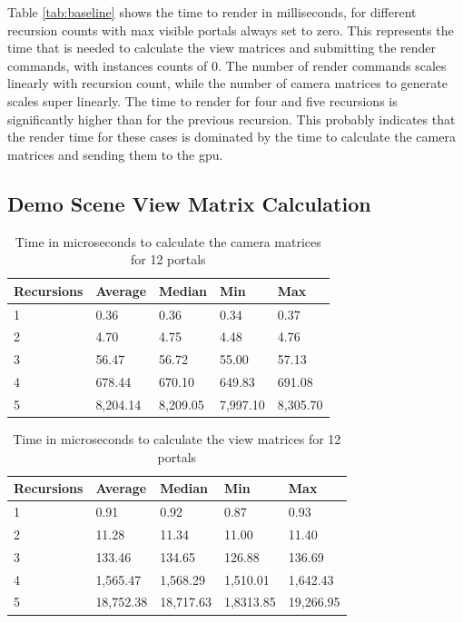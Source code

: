 Table \ref{tab:baseline} shows the time to render in milliseconds, for different recursion counts with max visible portals always set to zero. This represents the time that is needed to calculate the view matrices and submitting the render commands, with instances counts of 0. The number of render commands scales linearly with recursion count, while the number of camera matrices to generate scales super linearly. The time to render for four and five recursions is significantly higher than for the previous recursion. This probably indicates that the render time for these cases is dominated by the time to calculate the camera matrices and sending them to the \gls{gpu}.

\subsection{Demo Scene View Matrix Calculation}
\label{section:perfmatrixcalc}

\begin{table}[H]
	\centering
	\begin{tabular}{|l|l|l|l|l|}
		\hline
		Recursions & Average & Median  & Min     & Max     \\ \hline
		1          & 0.36    & 0.36    & 0.34    & 0.37    \\ \hline
		2          & 4.70    & 4.75    & 4.48    & 4.76    \\ \hline
		3          & 56.47   & 56.72   & 55.00   & 57.13   \\ \hline
		4          & 678.44  & 670.10  & 649.83  & 691.08  \\ \hline
		5          & 8,204.14 & 8,209.05 & 7,997.10 & 8,305.70\\ \hline
	\end{tabular}
	\caption{Time in microseconds to calculate the camera matrices for 12 portals}
	\label{tab:cameramatricecalc}
\end{table}

\begin{table}[H]
	\centering
	\begin{tabular}{|l|l|l|l|l|}
		\hline
		Recursions & Average   & Median  	& Min     	& Max        \\ \hline
		1          & 0.91      & 0.92		& 0.87    	& 0.93       \\ \hline
		2          & 11.28     & 11.34		& 11.00    	& 11.40      \\ \hline
		3          & 133.46    & 134.65		& 126.88   	& 136.69     \\ \hline
		4          & 1,565.47  & 1,568.29	& 1,510.01  & 1,642.43   \\ \hline
		5          & 18,752.38 & 18,717.63	& 1,8313.85 & 19,266.95 \\ \hline
	\end{tabular}
	\caption{Time in microseconds to calculate the view matrices for 12 portals}
	\label{tab:cameramatricecalcinverse}
\end{table}

